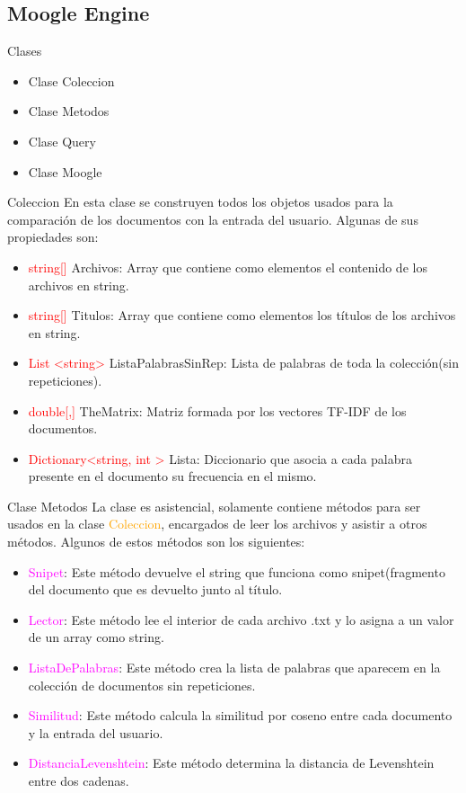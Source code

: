 \documentclass{beamer}
\begin{document}
\subsection{Moogle Engine}
\begin{frame}{Clases}
\begin{itemize}
\item Clase Coleccion
\item Clase Metodos
\item Clase Query
\item Clase Moogle
\end{itemize}
\end{frame}
\begin{frame}{Coleccion}
En esta clase se construyen todos los objetos usados para la comparación de los documentos con la entrada del usuario. Algunas de sus propiedades son:
\begin{itemize}
   \item \textcolor{red}{string[]} Archivos: Array que contiene como elementos el contenido de los archivos en string.
  \item  \textcolor{red}{string[]} Titulos: Array que contiene como elementos los títulos de los archivos en string.
  \item \textcolor{red}{List \textless string\textgreater } ListaPalabrasSinRep: Lista de palabras de toda la colección(sin repeticiones).
  \item \textcolor{red}{double[,]} TheMatrix: Matriz formada por los vectores TF-IDF de los documentos.
  \item  \textcolor{red}{Dictionary\textless string, int \textgreater} Lista: Diccionario que asocia a cada palabra presente en el documento
su frecuencia en el mismo.
\end{itemize}

\end{frame}

\begin{frame}{Clase Metodos}
La clase es asistencial, solamente contiene métodos para ser usados en la clase \textcolor{orange}{Coleccion}, encargados de leer los archivos y asistir a otros métodos.  Algunos de estos métodos son los siguientes:
\begin{itemize}

\item \textcolor{magenta}{Snipet}: Este método devuelve el string que funciona como snipet(fragmento del documento que es devuelto junto al título.
\item \textcolor{magenta}{Lector}: Este método lee el interior de cada archivo .txt y lo asigna a un valor de un array como string.
\item \textcolor{magenta}{ListaDePalabras}: Este método crea la lista de palabras que aparecem en la colección de documentos sin repeticiones.
\item \textcolor{magenta}{Similitud}: Este método calcula la similitud por coseno entre cada documento y la entrada del usuario.
\item \textcolor{magenta}{DistanciaLevenshtein}: Este método determina la distancia de Levenshtein entre dos cadenas.
\end{itemize}
\end{frame}
\end{document}
